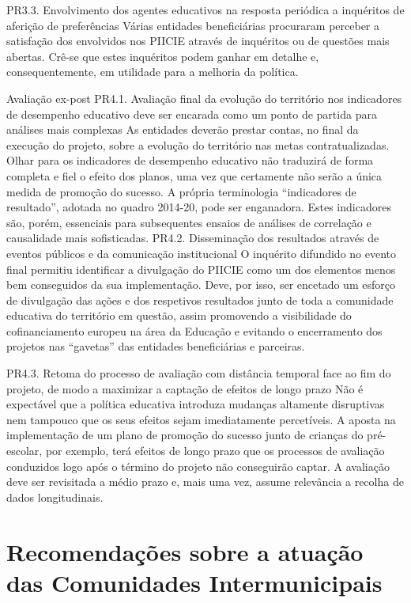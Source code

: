 \documentclass[
]{book}
\begin{document}
PR3.3. Envolvimento dos agentes educativos na resposta periódica a inquéritos de aferição de preferências
Várias entidades beneficiárias procuraram perceber a satisfação dos envolvidos nos PIICIE através de inquéritos ou de questões mais abertas. Crê-se que estes inquéritos podem ganhar em detalhe e, consequentemente, em utilidade para a melhoria da política.

Avaliação ex-post
PR4.1. Avaliação final da evolução do território nos indicadores de desempenho educativo deve ser encarada como um ponto de partida para análises mais complexas
As entidades deverão prestar contas, no final da execução do projeto, sobre a evolução do território nas metas contratualizadas. Olhar para os indicadores de desempenho educativo não traduzirá de forma completa e fiel o efeito dos planos, uma vez que certamente não serão a única medida de promoção do sucesso. A própria terminologia ``indicadores de resultado'', adotada no quadro 2014-20, pode ser enganadora. Estes indicadores são, porém, essenciais para subsequentes ensaios de análises de correlação e causalidade mais sofisticadas.
PR4.2. Disseminação dos resultados através de eventos públicos e da comunicação institucional
O inquérito difundido no evento final permitiu identificar a divulgação do PIICIE como um dos elementos menos bem conseguidos da sua implementação. Deve, por isso, ser encetado um esforço de divulgação das ações e dos respetivos resultados junto de toda a comunidade educativa do território em questão, assim promovendo a visibilidade do cofinanciamento europeu na área da Educação e evitando o encerramento dos projetos nas ``gavetas'' das entidades beneficiárias e parceiras.

PR4.3. Retoma do processo de avaliação com distância temporal face ao fim do projeto, de modo a maximizar a captação de efeitos de longo prazo
Não é expectável que a política educativa introduza mudanças altamente disruptivas nem tampouco que os seus efeitos sejam imediatamente percetíveis. A aposta na implementação de um plano de promoção do sucesso junto de crianças do pré-escolar, por exemplo, terá efeitos de longo prazo que os processos de avaliação conduzidos logo após o término do projeto não conseguirão captar. A avaliação deve ser revisitada a médio prazo e, mais uma vez, assume relevância a recolha de dados longitudinais.

\hypertarget{recomendauxe7uxf5es-sobre-a-atuauxe7uxe3o-das-comunidades-intermunicipais}{%
\section{\texorpdfstring{\textbf{Recomendações sobre a atuação das Comunidades Intermunicipais}}{Recomendações sobre a atuação das Comunidades Intermunicipais}}\label{recomendauxe7uxf5es-sobre-a-atuauxe7uxe3o-das-comunidades-intermunicipais}}
\end{document}
